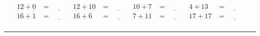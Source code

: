 \documentclass{article}
\begin{document}
\begin{sloppy}
\begin{align*}
    {12} + {0} &= \underline{\hspace{1cm}} & {12} + {10} &= \underline{\hspace{1cm}} & {10} + {7} &= \underline{\hspace{1cm}} & {4} + {13} &= \underline{\hspace{1cm}} \\
    {16} + {1} &= \underline{\hspace{1cm}} & {16} + {6} &= \underline{\hspace{1cm}} & {7} + {11} &= \underline{\hspace{1cm}} & {17} + {17} &= \underline{\hspace{1cm}} \\
\end{align*}
\hrule
\end{sloppy}
\end{document}
